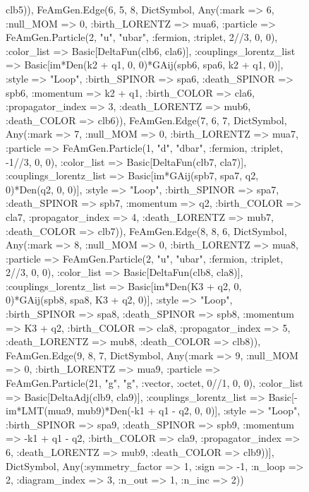 \documentclass{revtex4}
\begin{document}
\begin{figure}[!htb]
\begin{center}
{clb5)), FeAmGen.Edge(6, 5, 8, Dict{Symbol, Any}(:mark => 6, :null_MOM => 0, :birth_LORENTZ => mua6, :particle => FeAmGen.Particle(2, "u", "ubar", :fermion, :triplet, 2//3, 0, 0), :color_list => Basic[DeltaFun(clb6, cla6)], :couplings_lorentz_list => Basic[im*Den(k2 + q1, 0, 0)*GAij(spb6, spa6, k2 + q1, 0)], :style => "Loop", :birth_SPINOR => spa6, :death_SPINOR => spb6, :momentum => k2 + q1, :birth_COLOR => cla6, :propagator_index => 3, :death_LORENTZ => mub6, :death_COLOR => clb6)), FeAmGen.Edge(7, 6, 7, Dict{Symbol, Any}(:mark => 7, :null_MOM => 0, :birth_LORENTZ => mua7, :particle => FeAmGen.Particle(1, "d", "dbar", :fermion, :triplet, -1//3, 0, 0), :color_list => Basic[DeltaFun(clb7, cla7)], :couplings_lorentz_list => Basic[im*GAij(spb7, spa7, q2, 0)*Den(q2, 0, 0)], :style => "Loop", :birth_SPINOR => spa7, :death_SPINOR => spb7, :momentum => q2, :birth_COLOR => cla7, :propagator_index => 4, :death_LORENTZ => mub7, :death_COLOR => clb7)), FeAmGen.Edge(8, 8, 6, Dict{Symbol, Any}(:mark => 8, :null_MOM => 0, :birth_LORENTZ => mua8, :particle => FeAmGen.Particle(2, "u", "ubar", :fermion, :triplet, 2//3, 0, 0), :color_list => Basic[DeltaFun(clb8, cla8)], :couplings_lorentz_list => Basic[im*Den(K3 + q2, 0, 0)*GAij(spb8, spa8, K3 + q2, 0)], :style => "Loop", :birth_SPINOR => spa8, :death_SPINOR => spb8, :momentum => K3 + q2, :birth_COLOR => cla8, :propagator_index => 5, :death_LORENTZ => mub8, :death_COLOR => clb8)), FeAmGen.Edge(9, 8, 7, Dict{Symbol, Any}(:mark => 9, :null_MOM => 0, :birth_LORENTZ => mua9, :particle => FeAmGen.Particle(21, "g", "g", :vector, :octet, 0//1, 0, 0), :color_list => Basic[DeltaAdj(clb9, cla9)], :couplings_lorentz_list => Basic[-im*LMT(mua9, mub9)*Den(-k1 + q1 - q2, 0, 0)], :style => "Loop", :birth_SPINOR => spa9, :death_SPINOR => spb9, :momentum => -k1 + q1 - q2, :birth_COLOR => cla9, :propagator_index => 6, :death_LORENTZ => mub9, :death_COLOR => clb9))], Dict{Symbol, Any}(:symmetry_factor => 1, :sign => -1, :n_loop => 2, :diagram_index => 3, :n_out => 1, :n_inc => 2)) 
}
\end{center}
\end{figure}
\end{document}
